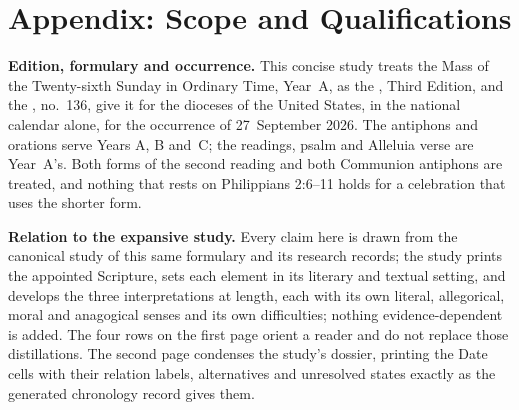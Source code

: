 
\section{Appendix: Scope and Qualifications}

{\footnotesize
\setlength{\parskip}{0pt}
\textbf{Edition, formulary and occurrence.} This concise study treats the Mass
of the Twenty-sixth Sunday in Ordinary Time, Year~A, as the , Third Edition, and the , no.~136, give it
for the dioceses of the United States, in the national calendar alone, for the
occurrence of 27~September 2026. The antiphons and orations serve Years A, B
and~C; the readings, psalm and Alleluia verse are Year~A's. Both forms of the
second reading and both Communion antiphons are treated, and nothing that rests
on Philippians 2:6--11 holds for a celebration that uses the shorter form.

\textbf{Relation to the expansive study.} Every claim here is drawn from the
canonical study of this same formulary and its research records; the study
prints the appointed Scripture, sets each element in its literary and textual
setting, and develops the three interpretations at length, each with its own
literal, allegorical, moral and anagogical senses and its own difficulties;
nothing evidence-dependent is added. The four rows on the first page orient a
reader and do not replace those distillations. The second page condenses the
study's dossier, printing the Date cells with their relation labels,
alternatives and unresolved states exactly as the generated chronology record
gives them.

}
